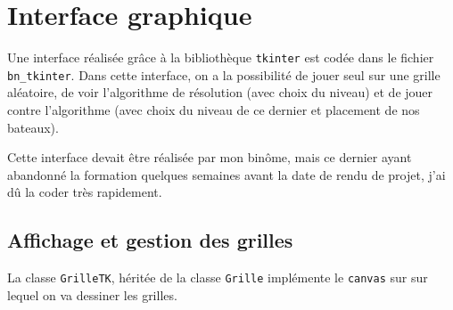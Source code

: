 \chapter{Interface graphique}

Une interface réalisée grâce à la bibliothèque \texttt{tkinter} est codée dans le fichier \texttt{bn\_tkinter}. Dans cette interface, on a la possibilité de jouer seul sur une grille aléatoire, de voir l'algorithme de résolution (avec choix du niveau) et de jouer contre l'algorithme (avec choix du niveau de ce dernier et placement de nos bateaux).

Cette interface devait être réalisée par mon binôme, mais ce dernier ayant abandonné la formation quelques semaines avant la date de rendu de projet, j'ai dû la coder très rapidement.

%
%
%
%
%
%

\section{Affichage et gestion des grilles}
La classe \texttt{GrilleTK}, héritée de la classe \texttt{Grille} implémente le \texttt{canvas} sur sur lequel on va dessiner les grilles.

